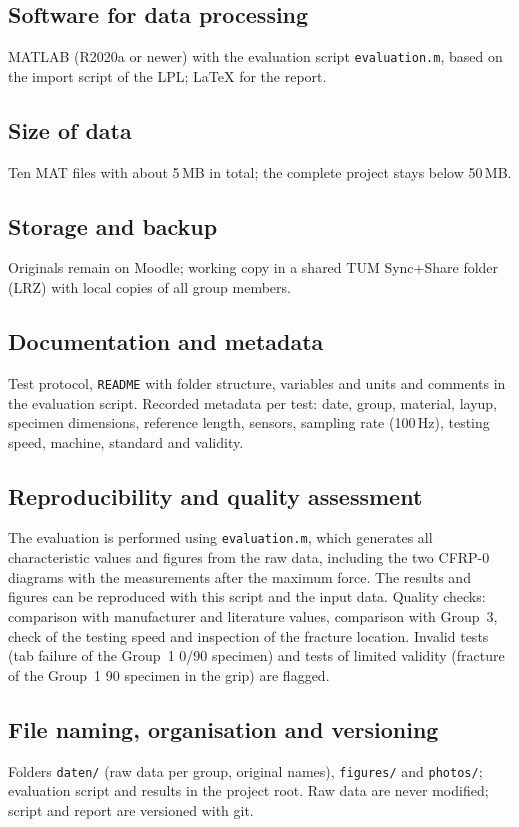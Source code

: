 \documentclass[11pt,a4paper]{article}
\begin{document}
\subsection*{Software for data processing}
MATLAB (R2020a or newer) with the evaluation script \texttt{evaluation.m},
based on the import script of the LPL; \LaTeX{} for the report.

\subsection*{Size of data}
Ten MAT files with about 5\,MB in total; the complete project stays below
50\,MB.

\subsection*{Storage and backup}
Originals remain on Moodle; working copy in a shared TUM Sync+Share folder
(LRZ) with local copies of all group members.

\subsection*{Documentation and metadata}
Test protocol, \texttt{README} with folder structure, variables and units
and comments in the evaluation script. Recorded metadata per test: date,
group, material, layup, specimen dimensions, reference length, sensors,
sampling rate (100\,Hz), testing speed, machine, standard and validity.

\subsection*{Reproducibility and quality assessment}
The evaluation is performed using \texttt{evaluation.m}, which
generates all characteristic values and figures from the raw data,
including the two CFRP-0\textdegree{} diagrams with the measurements after
the maximum force. The results and figures can be reproduced with this
script and the input data. Quality checks:
comparison with manufacturer and literature values, comparison with Group~3,
check of the testing speed and inspection of the fracture location.
Invalid tests (tab failure of the Group~1 0\textdegree/90\textdegree{}
specimen) and tests of limited validity (fracture of the Group~1
90\textdegree{} specimen in the grip) are flagged.

\subsection*{File naming, organisation and versioning}
Folders \texttt{daten/} (raw data per group, original names),
\texttt{figures/} and \texttt{photos/}; evaluation script and results in the
project root.
Raw data are never modified; script and report are versioned with git.
\end{document}
